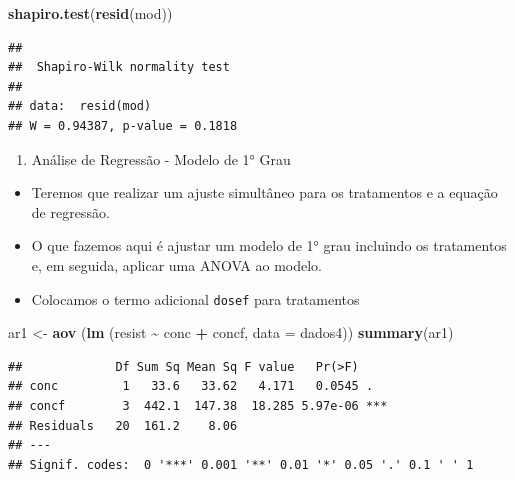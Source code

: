 \documentclass[
]{book}
\newenvironment{Shaded}{\begin{snugshade}}{\end{snugshade}}
\newcommand{\AttributeTok}[1]{\textcolor[rgb]{0.13,0.29,0.53}{#1}}
\newcommand{\FunctionTok}[1]{\textcolor[rgb]{0.13,0.29,0.53}{\textbf{#1}}}
\newcommand{\NormalTok}[1]{#1}
\newcommand{\OtherTok}[1]{\textcolor[rgb]{0.56,0.35,0.01}{#1}}
\newcommand{\SpecialCharTok}[1]{\textcolor[rgb]{0.81,0.36,0.00}{\textbf{#1}}}
\providecommand{\tightlist}{%
  \setlength{\itemsep}{0pt}\setlength{\parskip}{0pt}}
\begin{document}
\begin{Shaded}
\begin{Highlighting}[]
\FunctionTok{shapiro.test}\NormalTok{(}\FunctionTok{resid}\NormalTok{(mod))}
\end{Highlighting}
\end{Shaded}

\begin{verbatim}
## 
##  Shapiro-Wilk normality test
## 
## data:  resid(mod)
## W = 0.94387, p-value = 0.1818
\end{verbatim}

\begin{enumerate}
\def\labelenumi{\arabic{enumi}.}
\setcounter{enumi}{3}
\tightlist
\item
  Análise de Regressão - Modelo de 1° Grau
\end{enumerate}

\begin{itemize}
\item
  Teremos que realizar um ajuste simultâneo para os tratamentos e a equação de regressão.
\item
  O que fazemos aqui é ajustar um modelo de 1° grau incluindo os tratamentos e, em seguida, aplicar uma ANOVA ao modelo.
\item
  Colocamos o termo adicional \texttt{dosef} para tratamentos
\end{itemize}

\begin{Shaded}
\begin{Highlighting}[]
\NormalTok{ar1 }\OtherTok{\textless{}{-}} \FunctionTok{aov}\NormalTok{ (}\FunctionTok{lm}\NormalTok{ (resist }\SpecialCharTok{\textasciitilde{}}\NormalTok{ conc }\SpecialCharTok{+}\NormalTok{ concf, }\AttributeTok{data =}\NormalTok{ dados4))}
\FunctionTok{summary}\NormalTok{(ar1)}
\end{Highlighting}
\end{Shaded}

\begin{verbatim}
##             Df Sum Sq Mean Sq F value   Pr(>F)    
## conc         1   33.6   33.62   4.171   0.0545 .  
## concf        3  442.1  147.38  18.285 5.97e-06 ***
## Residuals   20  161.2    8.06                     
## ---
## Signif. codes:  0 '***' 0.001 '**' 0.01 '*' 0.05 '.' 0.1 ' ' 1
\end{verbatim}
\end{document}
